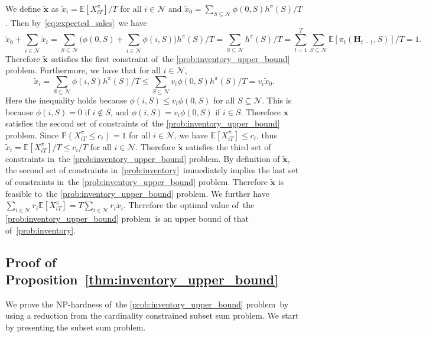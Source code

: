 \documentclass[mnsc,non-blindrev]{informs3}
\theoremstyle{definition}
\begin{document}
\begin{appendices}{\Large{}}
We define $\tilde{\bm{x}}$ as $\tilde{x}_i=\mathbb{E}[X_{iT}^\pi]/T$ for all $i\in\mathcal{N}$ and $\tilde{x}_0=\sum_{S\subseteq\mathcal{N}}\phi(0,S)h^\pi(S)/T$. Then by~\eqref{eq:expected_sales}~we have
\begin{equation*}
\tilde{x}_0+\sum_{i\in\mathcal{N}}\tilde{x}_i=\sum_{S\subseteq\mathcal{N}}\Big(\phi(0,S)+\sum_{i\in\mathcal{N}}\phi(i,S)\Big)h^\pi(S)/T=\sum_{S\subseteq\mathcal{N}}h^\pi(S)/T=\sum_{t=1}^T\sum_{S\subseteq\mathcal{N}}\mathbb{E}[\pi_t(\bm{H}_{t-1},S)]/T=1.
\end{equation*}
Therefore $\tilde{\bm{x}}$ satisfies the first constraint of~the \ref{prob:inventory_upper_bound} problem. Furthermore, we have that for all $i\in\mathcal{N}$,
\begin{equation*}
\tilde{x}_i=\sum_{S\subseteq\mathcal{N}}\phi(i,S)h^\pi(S)/T\leq \sum_{S\subseteq\mathcal{N}}v_i\phi(0,S)h^\pi(S)/T=v_i\tilde{x}_0.
\end{equation*}
Here the inequality holds because $\phi(i,S)\leq v_i\phi(0,S)$ for all $S\subseteq\mathcal{N}$. This is because $\phi(i,S)=0$ if $i\notin S$, and $\phi(i,S)=v_i\phi(0,S)$ if $i\in S$. Therefore $\bm{x}$ satisfies the second set of constraints of~the \ref{prob:inventory_upper_bound} problem. Since $\mathbb{P}(X_{iT}^\pi\leq c_i)=1$ for all $i\in\mathcal{N}$, we have $\mathbb{E}[X_{iT}^\pi]\leq c_i$, thus $\tilde{x}_i=\mathbb{E}[X_{iT}^\pi]/T\leq c_i/T$ for all $i\in\mathcal{N}$. Therefore $\tilde{\bm{x}}$ satisfies the third set of constraints in~the \ref{prob:inventory_upper_bound} problem. By definition of $\tilde{\bm{x}}$, the second set of constraints in~\ref{prob:inventory}~immediately implies the last set of constraints in~the \ref{prob:inventory_upper_bound} problem. Therefore $\tilde{\bm{x}}$ is feasible to~the \ref{prob:inventory_upper_bound} problem. We further have $\sum_{i\in\mathcal{N}}r_i\mathbb{E}[X_{iT}^\pi]=T\sum_{i\in\mathcal{N}}r_i\tilde{x}_i$. Therefore the optimal value of~the \ref{prob:inventory_upper_bound} problem~is an upper bound of that of~\ref{prob:inventory}.

\subsection{Proof of Proposition~\ref{thm:inventory_upper_bound}}\label{sec:thm:inventory_upper_bound}

We prove the NP-hardness of~the \ref{prob:inventory_upper_bound} problem~by using a reduction from the cardinality constrained subset sum problem. We start by presenting the subset sum problem.


\end{appendices}
\end{document}
